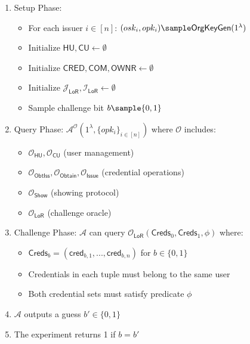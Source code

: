 \begin{enumerate}
    \item Setup Phase:
    \begin{itemize}
        \item For each issuer $i \in [n]$: $(osk_i, opk_i) \sample \mathsf{OrgKeyGen}(1^\lambda)$
        \item Initialize $\mathsf{HU, CU} \gets \emptyset$
        \item Initialize $\mathsf{CRED, COM, OWNR} \gets \emptyset$
        \item Initialize $\mathcal{J}_{\mathsf{LoR}}, \mathcal{I}_{\mathsf{LoR}} \gets \emptyset$
        \item Sample challenge bit $b \sample \{0,1\}$
    \end{itemize}

    \item Query Phase: $\mathcal{A}^{\mathcal{O}}(1^\lambda, \{opk_i\}_{i \in [n]})$ where $\mathcal{O}$ includes:
    \begin{itemize}
        \item $\mathcal{O}_{\mathsf{HU}}, \mathcal{O}_{\mathsf{CU}}$ (user management)
        \item $\mathcal{O}_{\mathsf{ObtIss}}, \mathcal{O}_{\mathsf{Obtain}}, \mathcal{O}_{\mathsf{Issue}}$ (credential operations)
        \item $\mathcal{O}_{\mathsf{Show}}$ (showing protocol)
        \item $\mathcal{O}_{\mathsf{LoR}}$ (challenge oracle)
    \end{itemize}

    \item Challenge Phase: 
    $\mathcal{A}$ can query $\mathcal{O}_{\mathsf{LoR}}(\mathsf{Creds}_0, \mathsf{Creds}_1, \phi)$ where:
    \begin{itemize}
        \item $\mathsf{Creds}_b = (\mathsf{cred}_{b,1},...,\mathsf{cred}_{b,n})$ for $b \in \{0,1\}$
        \item Credentials in each tuple must belong to the same user
        \item Both credential sets must satisfy predicate $\phi$
    \end{itemize}

    \item $\mathcal{A}$ outputs a guess $b' \in \{0,1\}$

    \item The experiment returns 1 if $b = b'$
\end{enumerate}











